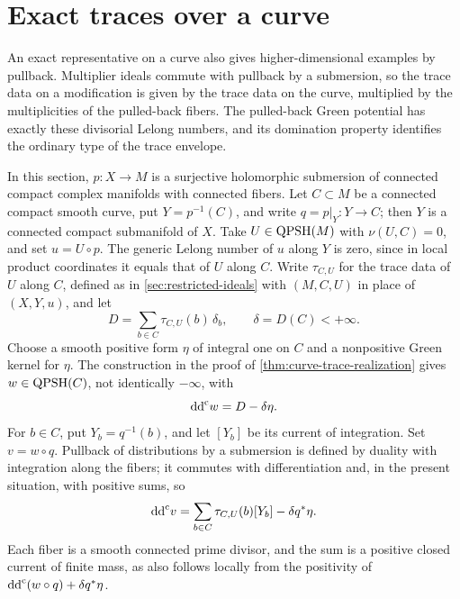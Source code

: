 \section{Exact traces over a curve}
\label{sec:curve-fibration-traces}

An exact representative on a curve also gives higher-dimensional examples by pullback. Multiplier ideals commute with pullback by a submersion, so the trace data on a modification is given by the trace data on the curve, multiplied by the multiplicities of the pulled-back fibers. The pulled-back Green potential has exactly these divisorial Lelong numbers, and its domination property identifies the ordinary type of the trace envelope.

In this section, $p\colon X\to M$ is a surjective holomorphic submersion of connected compact complex manifolds with connected fibers. Let $C\subset M$ be a connected compact smooth curve, put $Y=p^{-1}(C)$, and write $q=p|_Y\colon Y\to C$; then $Y$ is a connected compact submanifold of $X$. Take $U\in\mathrm{QPSH}(M)$ with $\nu(U,C)=0$, and set $u=U\circ p$. The generic Lelong number of $u$ along $Y$ is zero, since in local product coordinates it equals that of $U$ along $C$. Write $\tau_{C,U}$ for the trace data of $U$ along $C$, defined as in \cref{sec:restricted-ideals} with $(M,C,U)$ in place of $(X,Y,u)$, and let
\[
 D=\sum_{b\in C}\tau_{C,U}(b)\,\delta_b,
 \qquad \delta=D(C)<+\infty.
\]
Choose a smooth positive form $\eta$ of integral one on $C$ and a nonpositive Green kernel for $\eta$. The construction in the proof of \cref{thm:curve-trace-realization} gives $w\in\mathrm{QPSH}(C)$, not identically $-\infty$, with
\[
 \mathrm{dd}^{\mathrm{c}} w=D-\delta\eta.
\]
For $b\in C$, put $Y_b=q^{-1}(b)$, and let $[Y_b]$ be its current of integration. Set $v=w\circ q$. Pullback of distributions by a submersion is defined by duality with integration along the fibers; it commutes with differentiation and, in the present situation, with positive sums, so
\begin{equation}\label{eq:curve-fiber-divisorial-current}
 \mathrm{dd}^{\mathrm{c}} v=\sum_{b\in C}\tau_{C,U}(b)[Y_b]-\delta q^*\eta.
\end{equation}
Each fiber is a smooth connected prime divisor, and the sum is a positive closed current of finite mass, as also follows locally from the positivity of $\mathrm{dd}^{\mathrm{c}}(w\circ q)+\delta q^*\eta$.


